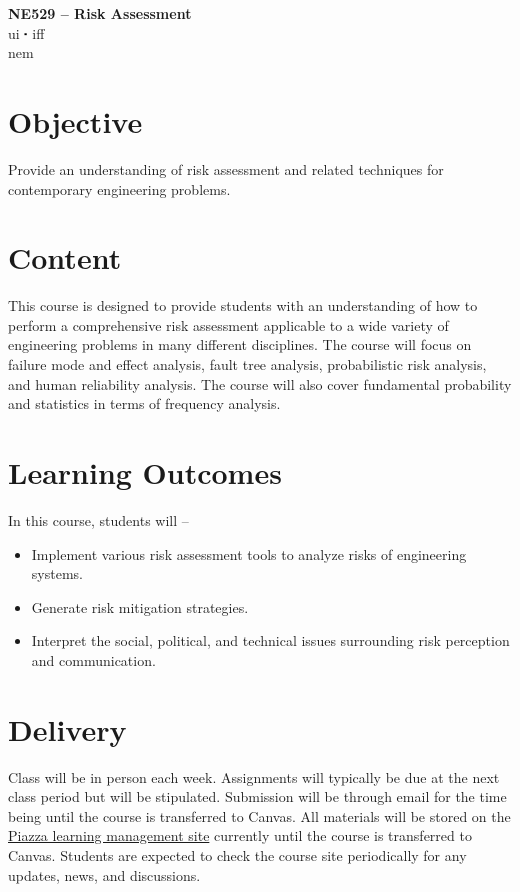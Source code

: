 \documentclass[11pt,letterpaper]{article}
\newcommand*\sq{\mathbin{\vcenter{\hbox{\rule{.3ex}{.3ex}}}}} %
\newcommand{\acl}{\acrlong} %
\begin{document}
{\centering 
    \textbf{NE529 -- Risk Assessment\\
    }
    \acl{ui} $\sq$ \acl{iff}\\
    \acl{nem}
\par
}

\noindent\makebox[\linewidth]{\rule{\textwidth}{0.5pt}} %


\section{Objective}
Provide an understanding of risk assessment and related techniques for contemporary engineering problems.


\section{Content}
This course is designed to provide students with an understanding of how to perform a comprehensive risk assessment applicable to a wide variety of engineering problems in many different disciplines. The course will focus on failure mode and effect analysis, fault tree analysis, probabilistic risk analysis, and human reliability analysis. The course will also cover fundamental probability and statistics in terms of frequency analysis. 

\section{Learning Outcomes}
In this course, students will --
\begin{itemize}[begin-vspace=0ex,item-vspace=-0.5ex,begin-extra-vspace=1ex,para-vspace=1ex,left-margin=2.25ex,item-indent=0ex]
    \item Implement various risk assessment tools to analyze risks of engineering systems.
    \item Generate risk mitigation strategies. 
    \item Interpret the social, political, and technical issues surrounding risk perception and communication. 
\end{itemize}


\section{Delivery}
Class will be in person each week. Assignments will typically be due at the next class period but will be stipulated. Submission will be through email for the time being until the course is transferred to Canvas. All materials will be stored on the \href{https://piazza.com/}{Piazza learning management site} currently until the course is transferred to Canvas. Students are expected to check the course site periodically for any updates, news, and discussions. 
\end{document}
